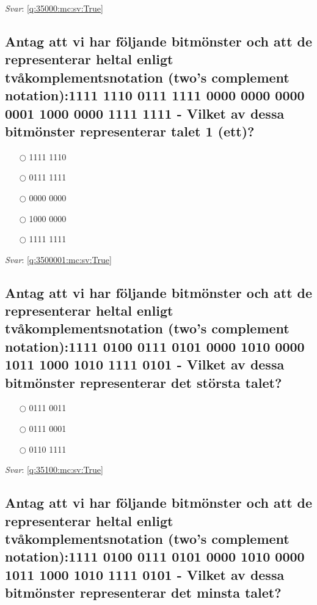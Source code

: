 \documentclass[a4paper,11pt,oneside]{article}
\begin{document}
\begin{sloppypar}
\vspace{1cm}

\textit{Svar}: \autoref{q:35000:mc:sv:True}

\subsection{Antag att vi har f\"oljande bitm\"onster och att de representerar heltal enligt tv\r{a}komplementsnotation (two{\textquoteright}s complement notation):1111 1110 0111 1111 0000 0000 0000 0001 1000 0000 1111 1111 - Vilket av dessa bitm\"onster representerar talet 1 (ett)?}

\label{q:3500001:mc:sv:False}

\begin{itemize}
  \item[$\bigcirc$] 1111 1110
  \item[$\bigcirc$] 0111 1111
  \item[$\bigcirc$] 0000 0000
  \item[$\bigcirc$] 1000 0000
  \item[$\bigcirc$] 1111 1111
\end{itemize}

\vspace{1cm}

\textit{Svar}: \autoref{q:3500001:mc:sv:True}



\subsection{Antag att vi har f\"oljande bitm\"onster och att de representerar heltal enligt tv\r{a}komplementsnotation (two{\textquoteright}s complement notation):1111 0100 0111 0101 0000 1010 0000 1011 1000 1010 1111 0101 - Vilket av dessa bitm\"onster representerar det st\"orsta talet?}

\label{q:35100:mc:sv:False}

\begin{itemize}
  \item[$\bigcirc$] 0111 0011
  \item[$\bigcirc$] 0111 0001
  \item[$\bigcirc$] 0110 1111
\end{itemize}

\vspace{1cm}

\textit{Svar}: \autoref{q:35100:mc:sv:True}

\subsection{Antag att vi har f\"oljande bitm\"onster och att de representerar heltal enligt tv\r{a}komplementsnotation (two{\textquoteright}s complement notation):1111 0100 0111 0101 0000 1010 0000 1011 1000 1010 1111 0101 - Vilket av dessa bitm\"onster representerar det minsta talet?}


\end{sloppypar}
\end{document}
